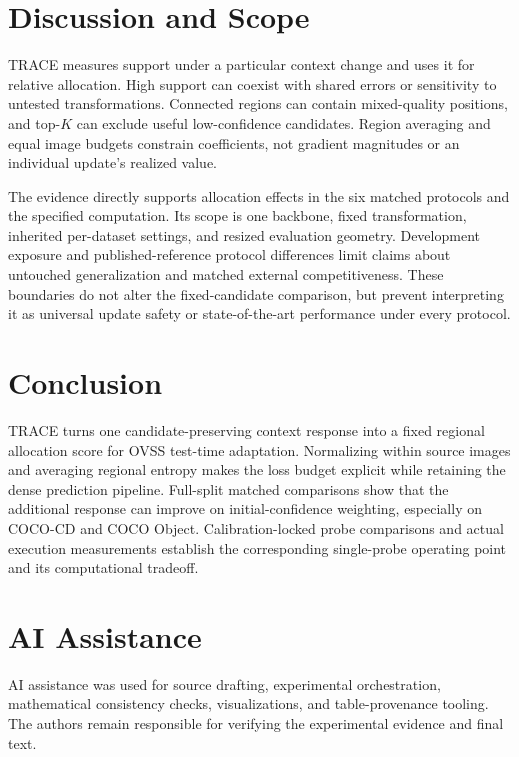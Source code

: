 \documentclass[letterpaper]{article}
\begin{document}
\section{Discussion and Scope}
TRACE measures support under a particular context change and uses it for relative allocation. High support can coexist with shared errors or sensitivity to untested transformations. Connected regions can contain mixed-quality positions, and top-$K$ can exclude useful low-confidence candidates. Region averaging and equal image budgets constrain coefficients, not gradient magnitudes or an individual update's realized value.

The evidence directly supports allocation effects in the six matched protocols and the specified computation. Its scope is one backbone, fixed transformation, inherited per-dataset settings, and resized evaluation geometry. Development exposure and published-reference protocol differences limit claims about untouched generalization and matched external competitiveness. These boundaries do not alter the fixed-candidate comparison, but prevent interpreting it as universal update safety or state-of-the-art performance under every protocol.

\section{Conclusion}
TRACE turns one candidate-preserving context response into a fixed regional allocation score for OVSS test-time adaptation. Normalizing within source images and averaging regional entropy makes the loss budget explicit while retaining the dense prediction pipeline. Full-split matched comparisons show that the additional response can improve on initial-confidence weighting, especially on COCO-CD and COCO Object. Calibration-locked probe comparisons and actual execution measurements establish the corresponding single-probe operating point and its computational tradeoff.

\section*{AI Assistance}
AI assistance was used for source drafting, experimental orchestration, mathematical consistency checks, visualizations, and table-provenance tooling. The authors remain responsible for verifying the experimental evidence and final text.


\clearpage
\appendix

\end{document}
